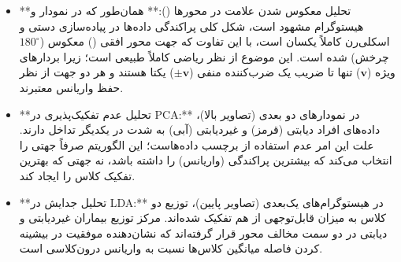\begin{stepbox}
{\begin{itemize}
\item **تحلیل معکوس شدن علامت در محورها ():** 
همان‌طور که در نمودار  و هیستوگرام  مشهود است، شکل کلی پراکندگی داده‌ها در پیاده‌سازی دستی و اسکلی‌رن کاملاً یکسان است، با این تفاوت که جهت محور افقی () معکوس ($180^\circ$ چرخش) شده است. این موضوع از نظر ریاضی کاملاً طبیعی است؛ زیرا بردارهای ویژه ($\mathbf{v}$) تنها تا ضریب یک ضرب‌کننده منفی ($\pm \mathbf{v}$) یکتا هستند و هر دو جهت از نظر حفظ واریانس معتبرند.

\item **تحلیل عدم تفکیک‌پذیری در PCA:**
در نمودارهای دو بعدی  (تصاویر بالا)، داده‌های افراد دیابتی (قرمز) و غیردیابتی (آبی) به شدت در یکدیگر تداخل دارند. علت این امر عدم استفاده  از برچسب داده‌هاست؛ این الگوریتم صرفاً جهتی را انتخاب می‌کند که بیشترین پراکندگی (واریانس) را داشته باشد، نه جهتی که بهترین تفکیک کلاس را ایجاد کند.

\item **تحلیل جدایش در LDA:**
در هیستوگرام‌های یک‌بعدی  (تصاویر پایین)، توزیع دو کلاس به میزان قابل‌توجهی از هم تفکیک شده‌اند. مرکز توزیع بیماران غیردیابتی و دیابتی در دو سمت مخالف محور قرار گرفته‌اند که نشان‌دهنده موفقیت  در بیشینه کردن فاصله میانگین کلاس‌ها نسبت به واریانس درون‌کلاسی است.
\end{itemize}
}


\end{stepbox}